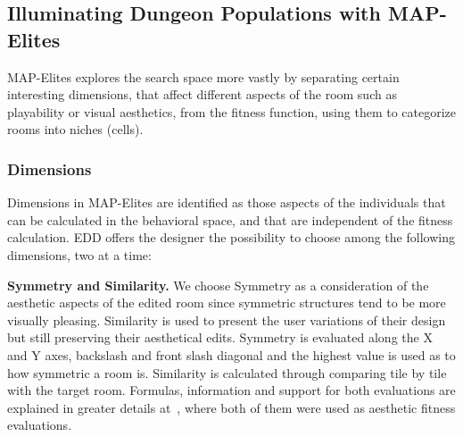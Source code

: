 \subsection{Illuminating Dungeon Populations with MAP-Elites}

MAP-Elites explores the search space more vastly by separating certain interesting dimensions, that affect different aspects of the room such as playability or visual aesthetics, from the fitness function, using them to categorize rooms into niches (cells). %

\subsubsection{Dimensions}

Dimensions in MAP-Elites are identified as those aspects of the individuals that can be calculated in the behavioral space, and that are independent of the fitness calculation. %
EDD offers the designer the possibility to choose among the following dimensions, two at a time:

\textbf{Symmetry and Similarity.} We choose Symmetry as a consideration of the aesthetic aspects of the edited room since symmetric structures tend to be more visually pleasing. Similarity is used to present the user variations of their design but still preserving their aesthetical edits. Symmetry is evaluated along the X and Y axes, backslash and front slash diagonal and the highest value is used as to how symmetric a room is. Similarity is calculated through comparing tile by tile with the target room. Formulas, information and support for both evaluations are explained in greater details at~, where both of them were used as aesthetic fitness evaluations.

